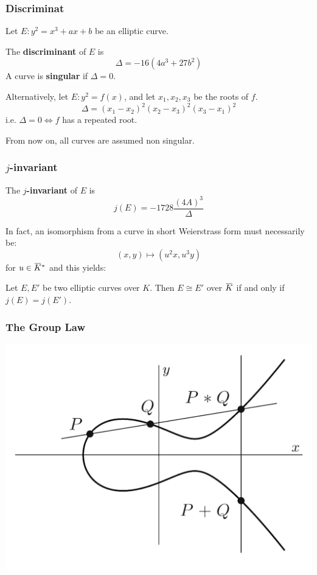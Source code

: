 \documentclass{beamer}
\newcommand{\overbar}[1]{\mkern 1.5mu\overline{\mkern-1.5mu#1\mkern-1.5mu}\mkern 1.5mu}
\begin{document}
\begin{frame}
    \frametitle{Discriminat}
    \begin{definition}
        Let $E: y^2 = x^3 + a x + b$ be an elliptic curve.

        The \textbf{discriminant} of $E$ is 
            \[ \Delta = -16 (4 a^3 + 27 b^2) \] 
        A curve is \textbf{singular} if $\Delta = 0$.
   \end{definition}
   \pause
    Alternatively, let $E: y^2 = f(x)$, and let $x_1, x_2, x_3$ be the roots of $f$. 
    \[ \Delta = (x_1 - x_2)^2(x_2 - x_3)^2(x_3 - x_1)^2 \]
    i.e. $\Delta = 0 \iff f$ has a repeated root.

    \pause
    From now on, all curves are assumed non singular.
    
\end{frame}

\begin{frame}
    \frametitle{$j$-invariant}
    \begin{definition}
         The $j$\textbf{-invariant} of $E$ is
            \[ j(E) = -1728 \frac{(4 A)^3}{\Delta} \]
    \end{definition} 
    \pause
    In fact, an isomorphism from a curve in short Weierstrass form must necessarily be:
    \[ (x, y) \mapsto (u^2 x, u^3 y) \]
    for $u \in \overbar{K}^*$ 
    \pause 
    and this yields:
     \begin{theorem}
        Let $E, E'$ be two elliptic curves over $K$. Then $E \cong E'$ over $\overbar{K}$ if and only if $j(E) = j(E')$. 
    \end{theorem}  
\end{frame}

\begin{frame}
    \frametitle{The Group Law} 
    \begin{center}
        \includegraphics[width=20 em]{group_law.png}
    \end{center}
\end{frame}
\end{document}
